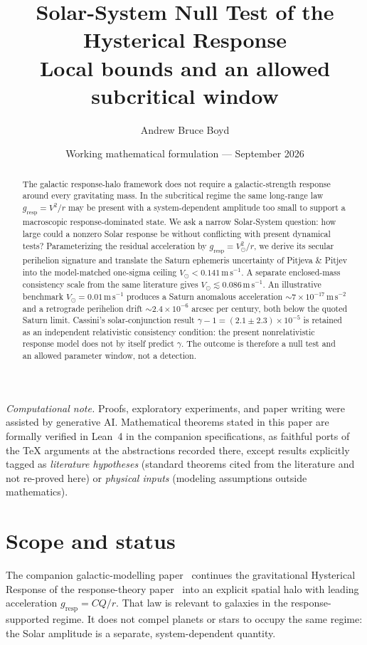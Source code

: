\documentclass[11pt]{article}
\title{\textbf{Solar-System Null Test of the Hysterical Response}\\[0.35em]
\large Local bounds and an allowed subcritical window}
\author{Andrew Bruce Boyd}
\date{Working mathematical formulation --- September 2026}
\theoremstyle{definition}
\theoremstyle{remark}
\begin{document}
\maketitle
\noindent\textit{Computational note.}
Proofs, exploratory experiments, and paper writing were assisted by generative AI.
Mathematical theorems stated in this paper are formally verified in Lean~4 in the
companion specifications, as faithful ports of the TeX arguments at the abstractions
recorded there, except results explicitly tagged as \emph{literature hypotheses}
(standard theorems cited from the literature and not re-proved here) or
\emph{physical inputs} (modeling assumptions outside mathematics).

\begin{abstract}
The galactic response-halo framework does not require a galactic-strength response around every gravitating mass.
In the subcritical regime the same long-range law $g_{\mathrm{resp}}=V^{2}/r$ may be present with a system-dependent amplitude too small to support a macroscopic response-dominated state.
We ask a narrow Solar-System question: how large could a nonzero Solar response be without conflicting with present dynamical tests?
Parameterizing the residual acceleration by $g_{\mathrm{resp}}=V_\odot^{2}/r$, we derive its secular perihelion signature and translate the Saturn ephemeris uncertainty of Pitjeva \& Pitjev into the model-matched one-sigma ceiling $V_\odot<0.141\,\mathrm{m\,s^{-1}}$.
A separate enclosed-mass consistency scale from the same literature gives $V_\odot\lesssim0.086\,\mathrm{m\,s^{-1}}$.
An illustrative benchmark $V_\odot=0.01\,\mathrm{m\,s^{-1}}$ produces a Saturn anomalous acceleration $\sim7\times10^{-17}\,\mathrm{m\,s^{-2}}$ and a retrograde perihelion drift $\sim2.4\times10^{-6}$ arcsec per century, both below the quoted Saturn limit.
Cassini's solar-conjunction result $\gamma-1=(2.1\pm2.3)\times10^{-5}$ is retained as an independent relativistic consistency condition: the present nonrelativistic response model does not by itself predict $\gamma$.
The outcome is therefore a null test and an allowed parameter window, not a detection.
\end{abstract}
\tableofcontents
\newpage

\section{Scope and status}
\label{sec:scope}
The companion galactic-modelling paper~\cite{boyd2026galactic} continues the gravitational Hysterical Response of the response-theory paper~\cite{boyd2026response} into an explicit spatial halo with leading acceleration $g_{\mathrm{resp}}=CQ/r$.
That law is relevant to galaxies in the response-supported regime.
It does not compel planets or stars to occupy the same regime: the Solar amplitude is a separate, system-dependent quantity.
\end{document}
